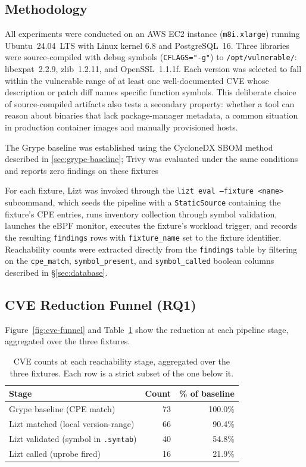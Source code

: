 \documentclass[conference]{IEEEtran}
\begin{document}
\subsection{Methodology}

All experiments were conducted on an AWS EC2 instance (\texttt{m8i.xlarge}) running Ubuntu~24.04~LTS with Linux kernel 6.8 and PostgreSQL~16.
Three libraries were source-compiled with debug symbols (\texttt{CFLAGS="-g"}) to \texttt{/opt/vulnerable/}: libexpat~2.2.9, zlib~1.2.11, and OpenSSL~1.1.1f.
Each version was selected to fall within the vulnerable range of at least one well-documented CVE whose description or patch diff names specific function symbols.
This deliberate choice of source-compiled artifacts also tests a secondary property: whether a tool can reason about binaries that lack package-manager metadata, a common situation in production container images and manually provisioned hosts.

The Grype baseline was established using the CycloneDX SBOM method described in \ref{sec:grype-baseline}; Trivy was evaluated under the same conditions and reports zero findings on these fixtures

For each fixture, Lizt was invoked through the \texttt{lizt eval --fixture <name>} subcommand, which seeds the pipeline with a \texttt{StaticSource} containing the fixture's CPE entries, runs inventory collection through symbol validation, launches the eBPF monitor, executes the fixture's workload trigger, and records the resulting \texttt{findings} rows with \texttt{fixture\_name} set to the fixture identifier.
Reachability counts were extracted directly from the \texttt{findings} table by filtering on the \texttt{cpe\_match}, \texttt{symbol\_present}, and \texttt{symbol\_called} boolean columns described in \S\ref{sec:database}.

\subsection{CVE Reduction Funnel (RQ1)}

Figure~\ref{fig:cve-funnel} and Table~\ref{tab:funnel-totals} show the reduction at each pipeline stage, aggregated over the three fixtures.

\begin{table}[h]
  \centering
  \caption{CVE counts at each reachability stage, aggregated over the three fixtures. Each row is a strict subset of the one below it.}
  \label{tab:funnel-totals}
  \begin{tabular}{lrr}
    \toprule
    \textbf{Stage} & \textbf{Count} & \textbf{\% of baseline} \\
    \midrule
    Grype baseline (CPE match)          & 73 & 100.0\% \\
    Lizt matched (local version-range)  & 66 &  90.4\% \\
    Lizt validated (symbol in \texttt{.symtab}) & 40 &  54.8\% \\
    Lizt called (uprobe fired)          & 16 &  21.9\% \\
    \bottomrule
  \end{tabular}
\end{table}
\end{document}
